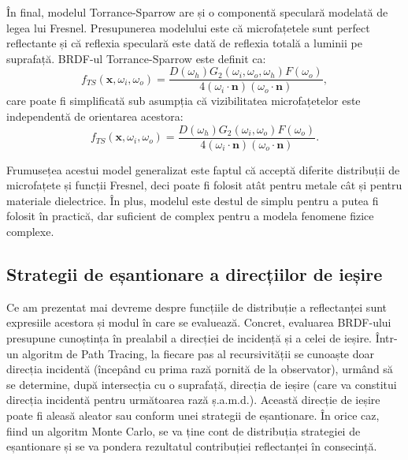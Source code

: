 \documentclass[12pt,a4paper]{report}
\numberwithin{equation}{section} %
\begin{document}
În final, modelul Torrance-Sparrow are și o componentă speculară modelată de legea
lui Fresnel. Presupunerea modelului este că microfațetele sunt perfect reflectante
și că reflexia speculară este dată de reflexia totală a luminii pe suprafață.
BRDF-ul Torrance-Sparrow este definit ca:
\begin{equation}
	f_{TS}(\mathbf{x}, \omega_i, \omega_o) = \frac{D(\omega_h)G_2(\omega_i, \omega_o, \omega_h)F(\omega_o)}{4(\omega_i \cdot \mathbf{n})(\omega_o \cdot \mathbf{n})},
\end{equation}
care poate fi simplificată sub asumpția că vizibilitatea microfațetelor este independentă
de orientarea acestora:
\begin{equation}
	f_{TS}(\mathbf{x}, \omega_i, \omega_o) = \frac{D(\omega_h)G_2(\omega_i, \omega_o)F(\omega_o)}{4(\omega_i \cdot \mathbf{n})(\omega_o \cdot \mathbf{n})}.
\end{equation}

Frumusețea acestui model generalizat este faptul că acceptă diferite distribuții
de microfațete și funcții Fresnel, deci poate fi folosit atât pentru metale cât
și pentru materiale dielectrice. În plus, modelul este destul de simplu pentru a
putea fi folosit în practică, dar suficient de complex pentru a modela fenomene
fizice complexe.

\subsection{Strategii de eșantionare a direcțiilor de ieșire}

Ce am prezentat mai devreme despre funcțiile de distribuție a reflectanței
sunt expresiile acestora și modul în care se evaluează. Concret, evaluarea
BRDF-ului presupune cunoștința în prealabil a direcției de incidență și a celei
de ieșire. Într-un algoritm de Path Tracing, la fiecare pas al recursivității
se cunoaște doar direcția incidentă (începând cu prima rază pornită de la observator),
urmând să se determine, după intersecția cu o suprafață, direcția de ieșire (care
va constitui direcția incidentă pentru următoarea rază ș.a.m.d.). Această
direcție de ieșire poate fi aleasă aleator sau conform unei strategii de eșantionare.
În orice caz, fiind un algoritm Monte Carlo, se va ține cont de distribuția strategiei
de eșantionare și se va pondera rezultatul contribuției reflectanței în consecință.
\end{document}

